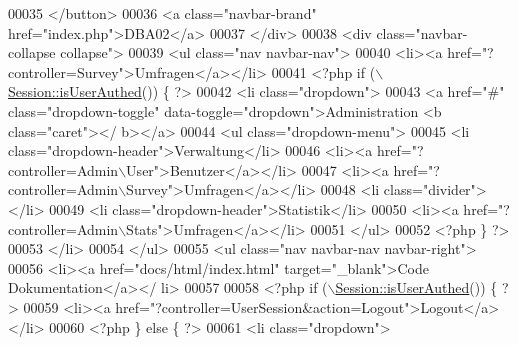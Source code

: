 \begin{DoxyCode}
00035           </button>
00036           <a \textcolor{keyword}{class}=\textcolor{stringliteral}{"navbar-brand"} href=\textcolor{stringliteral}{"index.php"}>DBA02</a>
00037         </div>
00038         <div \textcolor{keyword}{class}=\textcolor{stringliteral}{"navbar-collapse collapse"}>
00039           <ul \textcolor{keyword}{class}=\textcolor{stringliteral}{"nav navbar-nav"}>
00040             <li><a href=\textcolor{stringliteral}{"?controller=Survey"}>Umfragen</a></li>
00041             <?php \textcolor{keywordflow}{if} (\(\backslash\)\hyperlink{class_session_a23cee49624385c6af65af96fb1c682f6}{Session::isUserAuthed}()) \{ ?>
00042             <li \textcolor{keyword}{class}=\textcolor{stringliteral}{"dropdown"}>
00043               <a href=\textcolor{stringliteral}{"#"} \textcolor{keyword}{class}=\textcolor{stringliteral}{"dropdown-toggle"} data-toggle=\textcolor{stringliteral}{"dropdown"}>Administration <b \textcolor{keyword}{class}=\textcolor{stringliteral}{"caret"}></
      b></a>
00044               <ul \textcolor{keyword}{class}=\textcolor{stringliteral}{"dropdown-menu"}>
00045                 <li \textcolor{keyword}{class}=\textcolor{stringliteral}{"dropdown-header"}>Verwaltung</li>
00046                 <li><a href=\textcolor{stringliteral}{"?controller=Admin\(\backslash\)User"}>Benutzer</a></li>
00047                 <li><a href=\textcolor{stringliteral}{"?controller=Admin\(\backslash\)Survey"}>Umfragen</a></li>
00048                 <li \textcolor{keyword}{class}=\textcolor{stringliteral}{"divider"}></li>
00049                 <li \textcolor{keyword}{class}=\textcolor{stringliteral}{"dropdown-header"}>Statistik</li>
00050                 <li><a href=\textcolor{stringliteral}{"?controller=Admin\(\backslash\)Stats"}>Umfragen</a></li>
00051               </ul>
00052              <?php \} ?>
00053             </li>
00054           </ul>
00055           <ul \textcolor{keyword}{class}=\textcolor{stringliteral}{"nav navbar-nav navbar-right"}>
00056                                 <li><a href=\textcolor{stringliteral}{"docs/html/index.html"} target=\textcolor{stringliteral}{"\_blank"}>Code Dokumentation</a></
      li>
00057         
00058             <?php \textcolor{keywordflow}{if} (\(\backslash\)\hyperlink{class_session_a23cee49624385c6af65af96fb1c682f6}{Session::isUserAuthed}()) \{ ?>
00059                                 <li><a href=\textcolor{stringliteral}{"?controller=UserSession&action=Logout"}>Logout</a></li>
00060             <?php \} \textcolor{keywordflow}{else} \{ ?>
00061                           <li \textcolor{keyword}{class}=\textcolor{stringliteral}{"dropdown"}>

\end{DoxyCode}
